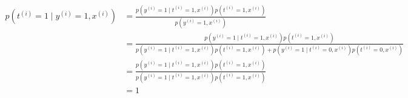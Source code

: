 \begin{answer}
\begin{align*}
p(t^{(i)}=1\mid y^{(i)} = 1, x^{(i)})&=\frac{p(y^{(i)} = 1\mid t^{(i)}=1, x^{(i)})p(t^{(i)}=1, x^{(i)})}{p(y^{(i)} = 1, x^{(i)})}\\
&=\frac{p(y^{(i)} = 1\mid t^{(i)}=1, x^{(i)})p(t^{(i)}=1, x^{(i)})}{p(y^{(i)} = 1\mid t^{(i)}=1, x^{(i)})p(t^{(i)}=1, x^{(i)})+p(y^{(i)} = 1\mid t^{(i)}=0, x^{(i)})p(t^{(i)}=0, x^{(i)})}\\
&=\frac{p(y^{(i)} = 1\mid t^{(i)}=1, x^{(i)})p(t^{(i)}=1, x^{(i)})}{p(y^{(i)} = 1\mid t^{(i)}=1, x^{(i)})p(t^{(i)}=1, x^{(i)})}\\
&=1
\end{align*}
\end{answer}
